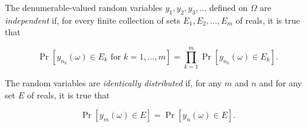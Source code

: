 The denumerable-valued random variables $y_1, y_2, y_3, \ldots$ defined on $\Omega$ are \textit{independent} if, for every finite collection of sets $E_1, E_2, \ldots, E_m$ of reals, it is true that

$$\Pr[y_{n_k}(\omega) \in E_k \text{ for } k = 1, \ldots, m] = \prod_{k=1}^{m} \Pr[y_{n_k}(\omega) \in E_k].$$

The random variables are \textit{identically distributed} if, for any $m$ and $n$ and for any set $E$ of reals, it is true that

$$\Pr[y_m(\omega) \in E] = \Pr[y_n(\omega) \in E].$$
